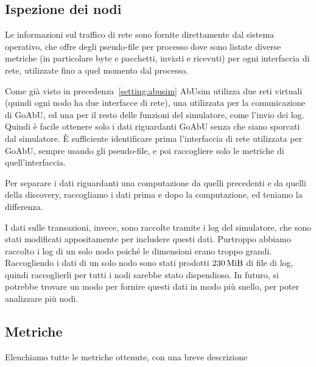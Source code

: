 \documentclass[12pt, a4paper]{article}
\begin{document}
\subsection{Ispezione dei nodi}

Le informazioni sul traffico di rete sono fornite direttamente dal sistema operativo, che offre degli pseudo-file per processo dove sono listate diverse metriche (in particolare byte e pacchetti, inviati e ricevuti) per ogni interfaccia di rete, utilizzate fino a quel momento dal processo.

Come già visto in precedenza~\ref{setting:abusim} AbUsim utilizza due reti virtuali (quindi ogni nodo ha due interfacce di rete), una utilizzata per la comunicazione di GoAbU, ed una per il resto delle funzioni del simulatore, come l'invio dei log.
Quindi è facile ottenere solo i dati riguardanti GoAbU senza che siano sporcati dal simulatore. È sufficiente identificare prima l'interfaccia di rete utilizzata per GoAbU, sempre usando gli pseudo-file, e poi raccogliere solo le metriche di quell'interfaccia.

Per separare i dati riguardanti una computazione da quelli precedenti e da quelli della discovery, raccogliamo i dati prima e dopo la computazione, ed teniamo la differenza.

I dati sulle transazioni, invece, sono raccolte tramite i log del simulatore, che sono stati modificati appositamente per includere questi dati.
Purtroppo abbiamo raccolto i log di un solo nodo poiché le dimensioni erano troppo grandi. Raccogliendo i dati di un solo nodo sono stati prodotti $\qty{230}{\mebi\byte}$ di file di log, quindi raccoglierli per tutti i nodi sarebbe stato dispendioso.
In futuro, si potrebbe trovare un modo per fornire questi dati in modo più snello, per poter analizzare più nodi.

\subsection{Metriche}

Elenchiamo tutte le metriche ottenute, con una breve descrizione
\end{document}
